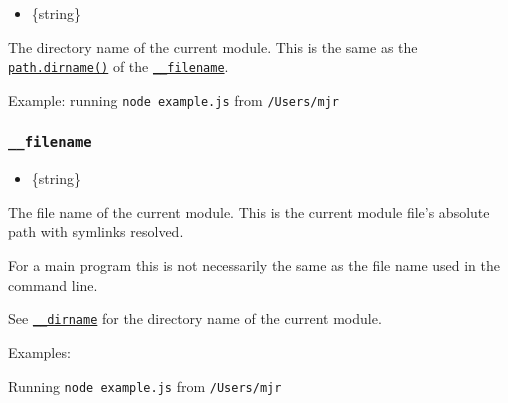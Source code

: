 \begin{itemize}
\tightlist
\item
  \{string\}
\end{itemize}

The directory name of the current module. This is the same as the
\href{path.md\#pathdirnamepath}{\texttt{path.dirname()}} of the
\hyperref[__filename]{\texttt{\_\_filename}}.

Example: running \texttt{node\ example.js} from \texttt{/Users/mjr}

\begin{Shaded}
\begin{Highlighting}[]
\NormalTok{(}\NormalTok{)}\OperatorTok{;}
\NormalTok{(}\NormalTok{))}\OperatorTok{;}
\end{Highlighting}
\end{Shaded}

\subsubsection{\texorpdfstring{\texttt{\_\_filename}}{\_\_filename}}\label{filename}

\begin{itemize}
\tightlist
\item
  \{string\}
\end{itemize}

The file name of the current module. This is the current module file's
absolute path with symlinks resolved.

For a main program this is not necessarily the same as the file name
used in the command line.

See \hyperref[__dirname]{\texttt{\_\_dirname}} for the directory name of
the current module.

Examples:

Running \texttt{node\ example.js} from \texttt{/Users/mjr}

\begin{Shaded}
\begin{Highlighting}[]
\NormalTok{(}\NormalTok{)}\OperatorTok{;}
\NormalTok{(}\NormalTok{)}\OperatorTok{;}
\end{Highlighting}
\end{Shaded}

